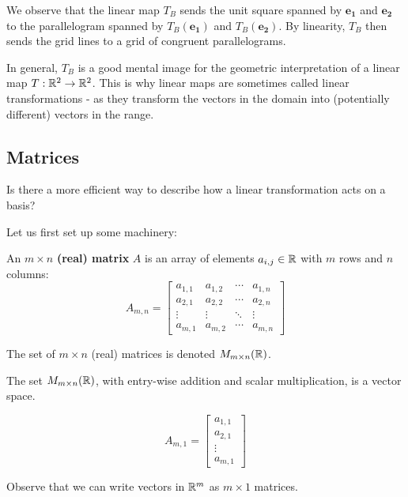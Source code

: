     We observe that the linear map $T_B$ sends the unit square spanned by $\bm{e_1}$ and $\bm{e_2}$ to the parallelogram spanned by $T_B(\bm{e_1})$ and $T_B(\bm{e_2})$.  By linearity, $T_B$ then sends the grid lines to a grid of congruent parallelograms.
    
    In general, $T_B$ is a good mental image for the geometric interpretation of a linear map $T: \mathbb{R}^2 \to \mathbb{R}^2$.  This is why linear maps are sometimes called linear transformations - as they transform the vectors in the domain into (potentially different) vectors in the range.


\subsection{Matrices}

\begin{motivating}
Is there a more efficient way to describe how a linear transformation acts on a basis?
\end{motivating}

Let us first set up some machinery:

\begin{definition}
    An $m \times n$ \textbf{(real) matrix} $A$ is an array of elements $a_{i,j} \in \mathbb{R}$ with $m$ rows and $n$
columns:
\begin{equation*}
A_{m,n} = 
\begin{bmatrix}
a_{1,1} & a_{1,2} & \cdots & a_{1,n} \\
a_{2,1} & a_{2,2} & \cdots & a_{2,n} \\
\vdots  & \vdots  & \ddots & \vdots  \\
a_{m,1} & a_{m,2} & \cdots & a_{m,n} 
\end{bmatrix}
\end{equation*}

The set of $m \times n$ (real) matrices is denoted $M_{m \times n}(\mathbb{R})$.
\vspace{1em}
    \end{definition}

\begin{theorem}
The set $M_{m \times n}(\mathbb{R})$, with entry-wise addition and scalar multiplication, is a vector space.
\end{theorem}

\begin{example}
    
    \begin{equation*}
A_{m,1} = 
\begin{bmatrix}
a_{1,1} \\
a_{2,1} \\
\vdots   \\
a_{m,1} 
\end{bmatrix}
\end{equation*}

Observe that we can write vectors in $\mathbb{R}^m$ as $m \times 1$ matrices.

    \end{example}

